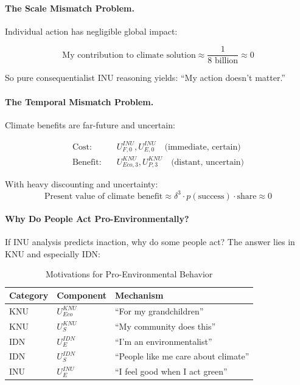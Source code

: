 \paragraph{The Scale Mismatch Problem.}
Individual action has negligible global impact:

\begin{equation}
\text{My contribution to climate solution} \approx \frac{1}{8 \text{ billion}} \approx 0
\end{equation}

So pure consequentialist INU reasoning yields: ``My action doesn't matter.''

\paragraph{The Temporal Mismatch Problem.}
Climate benefits are far-future and uncertain:

\begin{align}
\text{Cost:} &\quad U^{INU}_{F,0}, U^{INU}_{E,0} \quad \text{(immediate, certain)} \\
\text{Benefit:} &\quad U^{KNU}_{Eco,3}, U^{KNU}_{P,3} \quad \text{(distant, uncertain)}
\end{align}

With heavy discounting and uncertainty:
\begin{equation}
\text{Present value of climate benefit} \approx \delta^3 \cdot p(\text{success}) \cdot \text{share} \approx 0
\end{equation}

\paragraph{Why Do People Act Pro-Environmentally?}
If INU analysis predicts inaction, why do some people act? The answer
lies in KNU and especially IDN:

\begin{table}[htbp]
\centering
\caption{Motivations for Pro-Environmental Behavior}
\label{tab:env-motivations}
\renewcommand{\arraystretch}{1.3}
\begin{tabular}{@{}llp{5cm}@{}}
\toprule
\textbf{Category} & \textbf{Component} & \textbf{Mechanism} \\
\midrule
KNU & $U^{KNU}_{Eco}$ & ``For my grandchildren'' \\
KNU & $U^{KNU}_{S}$ & ``My community does this'' \\
IDN & $U^{IDN}_E$ & ``I'm an environmentalist'' \\
IDN & $U^{IDN}_S$ & ``People like me care about climate'' \\
INU & $U^{INU}_E$ & ``I feel good when I act green'' \\
\bottomrule
\end{tabular}
\end{table}

